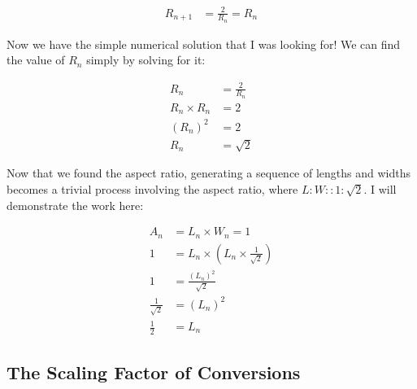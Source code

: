 \begin{align*}
  R_{n + 1} &= \frac{2}{R_{n}} = R_{n}
\end{align*}

\noindent
Now we have the simple numerical solution that I was looking for! We can find the value of $R_{n}$ simply by solving for it:

\begin{align*}
  R_{n} &= \frac{2}{R_{n}} \\
  R_{n} \times R_{n} &= 2 \\
  \left(R_{n}\right)^2 &= 2 \\
  R_{n} &= \sqrt{2}
\end{align*}

\noindent
Now that we found the aspect ratio, generating a sequence of lengths and widths becomes a trivial process involving the aspect ratio, where $L:W::1:\sqrt{2}$. I will demonstrate the work here:

\begin{align*}
  A_{n} &= L_{n} \times W_{n} = 1 \\
      1 &= L_{n} \times \left(L_{n} \times \frac{1}{\sqrt{2}}\right) \\
      1 &= \frac{\left(L_{n}\right)^2}{\sqrt{2}} \\
  \frac{1}{\sqrt{2}} &= \left(L_{n}\right)^2 \\
  \frac{1}{2} &= L_{n}
\end{align*}

\subsection*{The Scaling Factor of Conversions}
